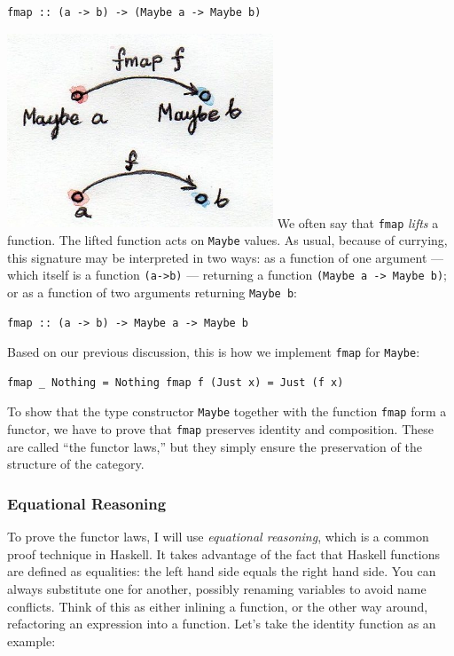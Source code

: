 \begin{verbatim}
fmap :: (a -> b) -> (Maybe a -> Maybe b)
\end{verbatim}

\includegraphics[width=3.12500in]{images/functormaybe.jpg} We often say
that \texttt{fmap} \emph{lifts} a function. The lifted function acts on
\texttt{Maybe} values. As usual, because of currying, this signature may
be interpreted in two ways: as a function of one argument --- which
itself is a function \texttt{(a-\textgreater{}b)} --- returning a
function \texttt{(Maybe\ a\ -\textgreater{}\ Maybe\ b)}; or as a
function of two arguments returning \texttt{Maybe\ b}:

\begin{verbatim}
fmap :: (a -> b) -> Maybe a -> Maybe b
\end{verbatim}

Based on our previous discussion, this is how we implement \texttt{fmap}
for \texttt{Maybe}:

\begin{verbatim}
fmap _ Nothing = Nothing fmap f (Just x) = Just (f x)
\end{verbatim}

To show that the type constructor \texttt{Maybe} together with the
function \texttt{fmap} form a functor, we have to prove that
\texttt{fmap} preserves identity and composition. These are called ``the
functor laws,'' but they simply ensure the preservation of the structure
of the category.

\subsubsection{Equational Reasoning}\label{equational-reasoning}

To prove the functor laws, I will use \emph{equational reasoning}, which
is a common proof technique in Haskell. It takes advantage of the fact
that Haskell functions are defined as equalities: the left hand side
equals the right hand side. You can always substitute one for another,
possibly renaming variables to avoid name conflicts. Think of this as
either inlining a function, or the other way around, refactoring an
expression into a function. Let's take the identity function as an
example:

